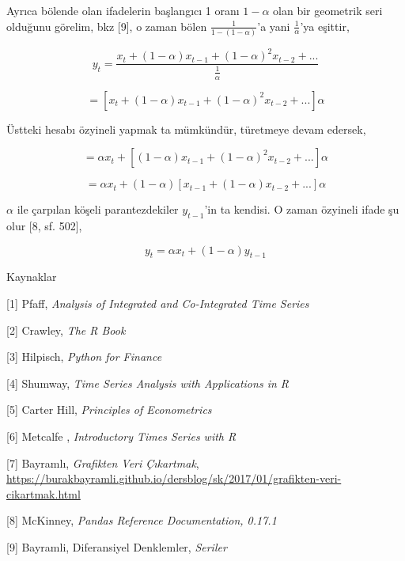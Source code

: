 \documentclass[12pt,fleqn]{article}\usepackage{../../common}
\begin{document}
Ayrıca bölende olan ifadelerin başlangıcı 1 oranı $1-\alpha$ olan bir
geometrik seri olduğunu görelim, bkz [9], o zaman bölen
$\frac{1}{1-(1-\alpha)}$'a yani $\frac{1}{\alpha}$'ya eşittir,

$$ y_t = \frac{x_t + (1-\alpha)x_{t-1} + (1-\alpha)^2x_{t-2} + ... }
{\frac{1}{\alpha}}
$$

$$  = [ x_t + (1-\alpha)x_{t-1} + (1-\alpha)^2x_{t-2} + ... ] \alpha $$

Üstteki hesabı özyineli yapmak ta mümkündür, türetmeye devam edersek,

$$  = \alpha x_t + [(1-\alpha)x_{t-1} + (1-\alpha)^2x_{t-2} + ... ]\alpha $$

$$  = \alpha x_t + (1-\alpha) [x_{t-1} + (1-\alpha)x_{t-2} + ... ]\alpha $$

$\alpha$ ile çarpılan köşeli parantezdekiler $y_{t-1}$'in ta kendisi. O
zaman özyineli ifade şu olur [8, sf. 502],

$$ y_t = \alpha x_t + (1-\alpha) y_{t-1}$$


Kaynaklar

[1] Pfaff, {\em Analysis of Integrated and Co-Integrated Time Series}

[2] Crawley, {\em The R Book}

[3] Hilpisch, {\em Python for Finance}

[4] Shumway, {\em Time Series Analysis with Applications in R}

[5] Carter Hill, {\em Principles of Econometrics}

[6] Metcalfe , {\em Introductory Times Series with R}

[7] Bayramlı, 
    {\em Grafikten Veri Çıkartmak}, 
    \url{https://burakbayramli.github.io/dersblog/sk/2017/01/grafikten-veri-cikartmak.html}

[8] McKinney, {\em Pandas Reference Documentation, 0.17.1}

[9] Bayramli, Diferansiyel Denklemler, {\em Seriler}
\end{document}
